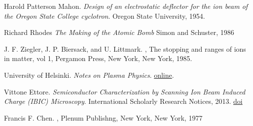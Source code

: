 
\begin{thebibliography}{9}

Harold Patterson Mahon.
\textit{Design of an electrostatic deflector for the ion beam of the Oregon State College cyclotron}.
Oregon State University, 1954.

Richard Rhodes
\textit{The Making of the Atomic Bomb}
Simon and Schuster, 1986

J. F. Ziegler, J. P. Biersack, and U. Littmark.
,
The stopping and ranges of ions in matter, vol 1,
Pergamon Press, New York, New York, 1985.

University of Helsinki.
\textit{Notes on Plasma Physics}.
\href{http://beam.helsinki.fi/~knordlun/mdh/rangetext.html}{online}.

Vittone Ettore.
\textit{Semiconductor Characterization by Scanning Ion Beam Induced Charge (IBIC) Microscopy}.
International Scholarly Research Notices, 2013.
\href{https://doi.org/10.1155/2013/637608}{doi}

Francis F. Chen.
,
Plenum Publishng, New York, New York, 1977

\end{thebibliography}